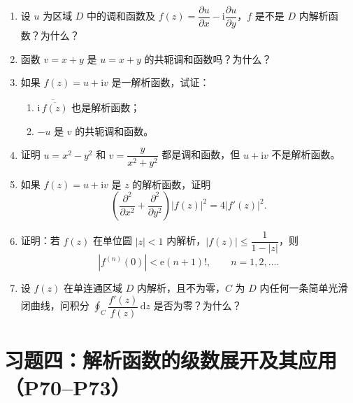 \documentclass[UTF8,11pt,a4paper]{ctexart}
\newcommand{\dd}{\,\mathrm{d}}
\newcommand{\ee}{\mathrm{e}}
\newcommand{\ii}{\mathrm{i}}
\begin{document}
\begin{enumerate}
\item 设 $u$ 为区域 $D$ 中的调和函数及
$f(z)=\dfrac{\partial u}{\partial x}-\ii\dfrac{\partial u}{\partial y}$，$f$ 是不是 $D$ 内解析函数？为什么？

\item 函数 $v=x+y$ 是 $u=x+y$ 的共轭调和函数吗？为什么？

\item 如果 $f(z)=u+\ii v$ 是一解析函数，试证：
  \begin{enumerate}
  \item $\overline{\ii\,\overline{f(z)}}$ 也是解析函数；
  \item $-u$ 是 $v$ 的共轭调和函数。
  \end{enumerate}

\item 证明 $u=x^2-y^2$ 和 $v=\dfrac{y}{x^2+y^2}$ 都是调和函数，但 $u+\ii v$ 不是解析函数。

\item 如果 $f(z)=u+\ii v$ 是 $z$ 的解析函数，证明
\[
\left(\frac{\partial^2}{\partial x^2}+\frac{\partial^2}{\partial y^2}\right)|f(z)|^2
=4|f'(z)|^2.
\]

\item 证明：若 $f(z)$ 在单位圆 $|z|<1$ 内解析，$|f(z)|\leqslant\dfrac1{1-|z|}$，则
\[
|f^{(n)}(0)|<\ee(n+1)!,\qquad n=1,2,\ldots.
\]

\item 设 $f(z)$ 在单连通区域 $D$ 内解析，且不为零，$C$ 为 $D$ 内任何一条简单光滑闭曲线，问积分
$\displaystyle\oint_C\dfrac{f'(z)}{f(z)}\dd z$ 是否为零？为什么？
\end{enumerate}

\newpage
\section{习题四：解析函数的级数展开及其应用（P70--P73）}
\end{document}
